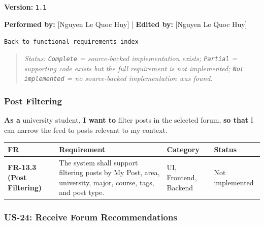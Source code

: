 \documentclass[12pt]{article}
\renewcommand{\baselinestretch}{1.5}
\begin{document}
\textbf{Version:} \texttt{1.1}
\par\medskip

\textbf{Performed by:} [Nguyen Le Quoc Huy] | \textbf{Edited by:} [Nguyen Le Quoc Huy]
\par\medskip

\texttt{Back to functional requirements index}
\par\medskip

\begin{quote}
\textit{Status: \texttt{Complete} = source-backed implementation exists; \texttt{Partial} = supporting code exists but the full requirement is not implemented; \texttt{Not implemented} = no source-backed implementation was found.}
\end{quote}
\par\medskip

\hypertarget{sec:post-filtering}{}
\subsubsection*{Post Filtering}
\par\medskip

\textbf{As a} university student, \textbf{I want to} filter posts in the selected forum, \textbf{so that} I can narrow the feed to posts relevant to my context.
\par\medskip

\begingroup
\small
\renewcommand{\baselinestretch}{1.0}\selectfont
\renewcommand{\arraystretch}{1.15}
\setlength{\tabcolsep}{6pt}
\begin{longtable}{|>{\raggedright\arraybackslash}p{}|>{\raggedright\arraybackslash}p{}|>{\raggedright\arraybackslash}p{}|>{\raggedright\arraybackslash}p{}|}
\hline
\textbf{FR} & \textbf{Requirement} & \textbf{Category} & \textbf{Status} \\ \hline
\endhead
\textbf{FR-13.3 (Post Filtering)} & The system shall support filtering posts by My Post, area, university, major, course, tags, and post type. & UI, Frontend, Backend & Not implemented \\ \hline
\end{longtable}
\endgroup
\par\medskip

\hypertarget{sec:us-24-receive-forum-recommendations}{}
\subsubsection*{US-24: Receive Forum Recommendations}
\par\medskip
\end{document}
